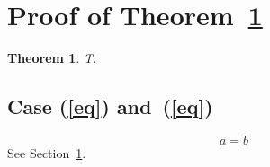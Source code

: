 \documentclass{article}
\begin{document}
\tableofcontents
\section{Proof of Theorem~\ref{thm}}\label{sec}
\newtheorem{theorem}{Theorem}
\begin{theorem}\label{thm} T. \end{theorem}
\subsection{Case (\ref{eq}) and~(\ref{eq})}
\begin{equation} a=b \label{eq}\end{equation}
See Section~\ref{sec}.
\end{document}
